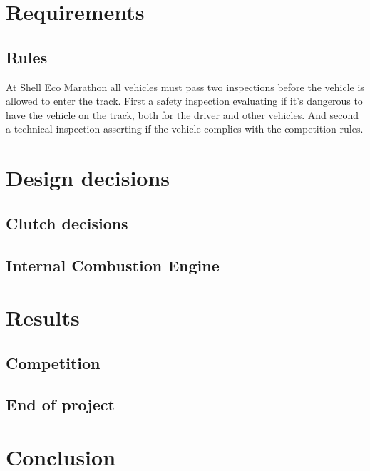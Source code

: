 \section{Requirements}
\subsection{Rules}
At Shell Eco Marathon all vehicles must pass two inspections before the vehicle is allowed to enter the track. First a safety inspection evaluating if it's dangerous to have the vehicle on the track, both for the driver and other vehicles. And second a technical inspection asserting if the vehicle complies with the competition rules.

\section{Design decisions}
\subsection{Clutch decisions}

\subsection{Internal Combustion Engine}

\section{Results}
\subsection{Competition}

\subsection{End of project}

\section{Conclusion}